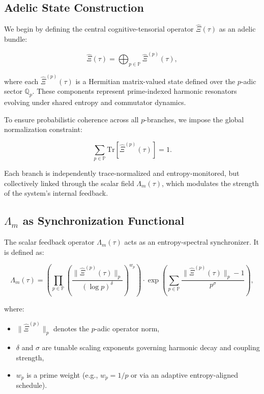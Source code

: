 \documentclass{article}
\theoremstyle{plain}
\theoremstyle{claimstyle}
\begin{document}
\subsection{Adelic State Construction}

We begin by defining the central cognitive-tensorial operator $\hat{\Xi}(\tau)$ as an adelic bundle:

\begin{equation}
\hat{\Xi}(\tau) = \bigoplus_{p \in \mathbb{P}} \hat{\Xi}^{(p)}(\tau),
\end{equation}

where each $\hat{\Xi}^{(p)}(\tau)$ is a Hermitian matrix-valued state defined over the $p$-adic sector $\mathbb{Q}_p$. These components represent prime-indexed harmonic resonators evolving under shared entropy and commutator dynamics.

To ensure probabilistic coherence across all $p$-branches, we impose the global normalization constraint:

\begin{equation}
\sum_{p \in \mathbb{P}} \text{Tr} \left[ \hat{\Xi}^{(p)}(\tau) \right] = 1.
\end{equation}

Each branch is independently trace-normalized and entropy-monitored, but collectively linked through the scalar field $\Lambda_m(\tau)$, which modulates the strength of the system's internal feedback.

\subsection{$\Lambda_m$ as Synchronization Functional}

The scalar feedback operator $\Lambda_m(\tau)$ acts as an entropy-spectral synchronizer. It is defined as:

\begin{equation}
\Lambda_m(\tau) = \left( \prod_{p \in \mathbb{P}} \left( \frac{\|\hat{\Xi}^{(p)}(\tau)\|_p}{(\log p)^\delta} \right)^{w_p} \right) \cdot \exp \left( \sum_{p \in \mathbb{P}} \frac{\|\hat{\Xi}^{(p)}(\tau)\|_p - 1}{p^\sigma} \right),
\end{equation}

where:
\begin{itemize}
    \item $\|\hat{\Xi}^{(p)}\|_p$ denotes the $p$-adic operator norm,
    \item $\delta$ and $\sigma$ are tunable scaling exponents governing harmonic decay and coupling strength,
    \item $w_p$ is a prime weight (e.g., $w_p = 1/p$ or via an adaptive entropy-aligned schedule).
\end{itemize}
\end{document}
